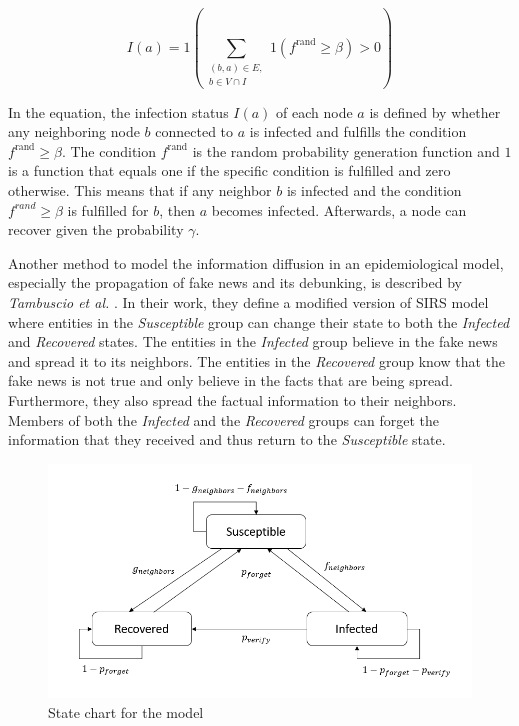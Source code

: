\begin{equation}
    I(a) = 1 (\sum\limits_{\substack{(b,a)\in E, \\ b \in V \cap I}}
    1(f^{\mathrm{rand}}\geq \beta)>0) 
    \label{eqbasicpropagation}
\end{equation}

In the equation, the infection status $I(a)$ of each node $a$ is defined 
by whether any neighboring node $b$ connected to $a$ is infected 
and fulfills the condition $f^{\mathrm{rand}}\geq \beta$.
The condition $f^{\mathrm{rand}}$ is the random probability generation function and $1$ 
is a function that equals one if the specific condition is fulfilled and 
zero otherwise. This means that if any neighbor $b$ is infected and the 
condition $f^{rand}\geq \beta$ is fulfilled for $b$, then $a$ becomes infected. 
Afterwards, a node can recover given the probability $\gamma$.

Another method to model the information diffusion in an epidemiological model, 
especially the propagation of fake news and its debunking,
is described by \textit{Tambuscio et al.} \cite{sirsmodel}. In their work, they
define a modified version of SIRS model where entities in the \textit{Susceptible}
group can change their state to both the \textit{Infected} and
\textit{Recovered} states.
The entities in the \textit{Infected} group believe in the fake news and spread it 
to its neighbors.
The entities in the \textit{Recovered} group know that the fake news is not 
true and only believe in the facts that are being spread. Furthermore, they
also spread the factual information to their neighbors.
Members of both the \textit{Infected} and the \textit{Recovered} groups 
can forget the information that they received 
and thus return to the \textit{Susceptible} state.

\begin{figure}[!ht]
    \center
    \includegraphics[scale=.9]{figs/Tambuscio.png}
    \caption{State chart for the model \cite{sirsmodel}}
    \label{originalmodelstatechart}
\end{figure}

